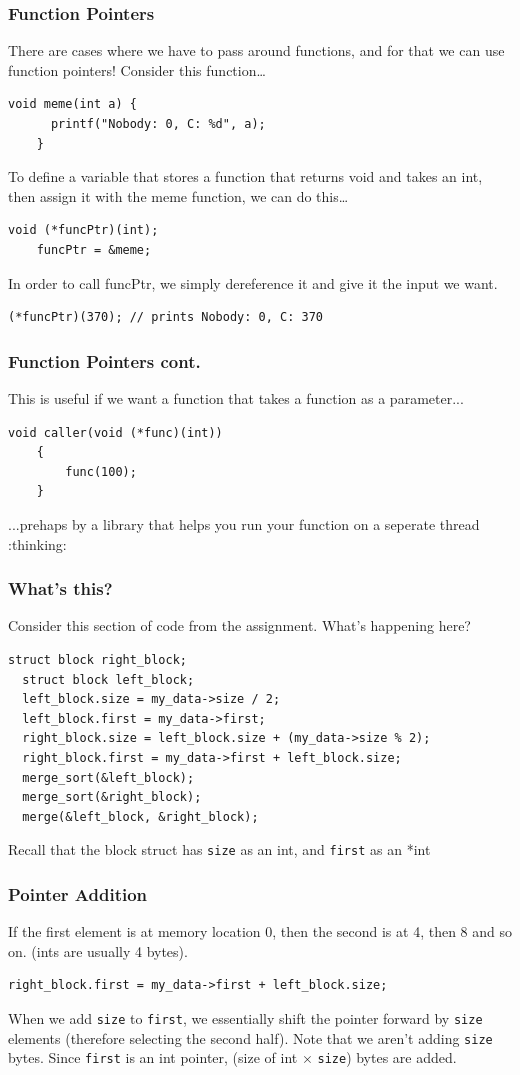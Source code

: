 \documentclass{beamer}
\begin{document}
\begin{frame}[fragile]
  \frametitle{Function Pointers}
  There are cases where we have to pass around functions, and for that we can use function pointers! Consider this function\dots
  \begin{lstlisting}[style=customc]
    void meme(int a) {
      printf("Nobody: 0, C: %d", a);
    }
  \end{lstlisting}
  To define a variable that stores a function that returns void and takes an int, then assign it with the meme function, we can do this\dots
  \begin{lstlisting}[style=customc]
    void (*funcPtr)(int);
    funcPtr = &meme;
  \end{lstlisting}
  In order to call funcPtr, we simply dereference it and give it the input we want.
  \begin{lstlisting}[style=customc]
    (*funcPtr)(370); // prints Nobody: 0, C: 370
  \end{lstlisting}
\end{frame}
\begin{frame}[fragile]
  \frametitle{Function Pointers cont.}
  This is useful if we want a function that takes a function as a parameter...
  \begin{lstlisting}[style=customc]
    void caller(void (*func)(int)) 
    { 
        func(100);
    } 
  \end{lstlisting}
  ...prehaps by a library that helps you run your function on a seperate thread :thinking:
\end{frame}
\begin{frame}[fragile]
  \frametitle{What's this?}
  Consider this section of code from the assignment. What's happening here?
  \begin{lstlisting}[style=customc]
  struct block right_block;
  struct block left_block;
  left_block.size = my_data->size / 2;
  left_block.first = my_data->first;
  right_block.size = left_block.size + (my_data->size % 2);
  right_block.first = my_data->first + left_block.size;
  merge_sort(&left_block);
  merge_sort(&right_block);
  merge(&left_block, &right_block);
  \end{lstlisting}
  Recall that the block struct has \texttt{size} as an int, and \texttt{first} as an *int
\end{frame}
\begin{frame}[fragile]
  \frametitle{Pointer Addition}
  If the first element is at memory location 0, then the second is at 4, then 8 and so on. (ints are usually 4 bytes).
  \begin{lstlisting}[style=customc]
  right_block.first = my_data->first + left_block.size;
  \end{lstlisting}
  When we add \texttt{size} to \texttt{first}, we essentially shift the pointer forward by \texttt{size} elements (therefore selecting the second half). Note that we aren't adding \texttt{size} bytes. Since \texttt{first} is an int pointer, (size of int $\times$ \texttt{size}) bytes are added.
\end{frame}
\end{document}

